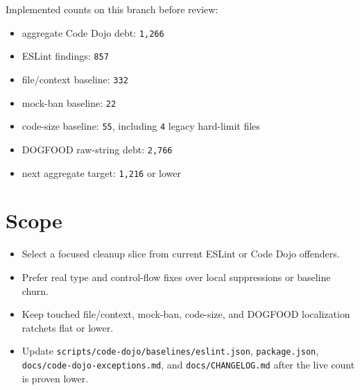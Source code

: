 Implemented counts on this branch before review:

\begin{itemize}
\tightlist
\item
  aggregate Code Dojo debt: \texttt{1\allowbreak{},\allowbreak{}2\allowbreak{}6\allowbreak{}6}
\item
  ESLint findings: \texttt{8\allowbreak{}5\allowbreak{}7}
\item
  file/context baseline: \texttt{3\allowbreak{}3\allowbreak{}2}
\item
  mock-ban baseline: \texttt{2\allowbreak{}2}
\item
  code-size baseline: \texttt{5\allowbreak{}5}, including \texttt{4} legacy hard-limit files
\item
  DOGFOOD raw-string debt: \texttt{2\allowbreak{},\allowbreak{}7\allowbreak{}6\allowbreak{}6}
\item
  next aggregate target: \texttt{1\allowbreak{},\allowbreak{}2\allowbreak{}1\allowbreak{}6} or lower
\end{itemize}

\section{Scope}\label{record-230-scope}

\begin{itemize}
\tightlist
\item
  Select a focused cleanup slice from current ESLint or Code Dojo offenders.
\item
  Prefer real type and control-flow fixes over local suppressions or baseline churn.
\item
  Keep touched file/context, mock-ban, code-size, and DOGFOOD localization ratchets flat or lower.
\item
  Update \texttt{s\allowbreak{}c\allowbreak{}r\allowbreak{}i\allowbreak{}p\allowbreak{}t\allowbreak{}s\allowbreak{}/\allowbreak{}c\allowbreak{}o\allowbreak{}d\allowbreak{}e\allowbreak{}-\allowbreak{}d\allowbreak{}o\allowbreak{}j\allowbreak{}o\allowbreak{}/\allowbreak{}b\allowbreak{}a\allowbreak{}s\allowbreak{}e\allowbreak{}l\allowbreak{}i\allowbreak{}n\allowbreak{}e\allowbreak{}s\allowbreak{}/\allowbreak{}e\allowbreak{}s\allowbreak{}l\allowbreak{}i\allowbreak{}n\allowbreak{}t\allowbreak{}.\allowbreak{}j\allowbreak{}s\allowbreak{}o\allowbreak{}n}, \texttt{p\allowbreak{}a\allowbreak{}c\allowbreak{}k\allowbreak{}a\allowbreak{}g\allowbreak{}e\allowbreak{}.\allowbreak{}j\allowbreak{}s\allowbreak{}o\allowbreak{}n}, \texttt{d\allowbreak{}o\allowbreak{}c\allowbreak{}s\allowbreak{}/\allowbreak{}c\allowbreak{}o\allowbreak{}d\allowbreak{}e\allowbreak{}-\allowbreak{}d\allowbreak{}o\allowbreak{}j\allowbreak{}o\allowbreak{}-\allowbreak{}e\allowbreak{}x\allowbreak{}c\allowbreak{}e\allowbreak{}p\allowbreak{}t\allowbreak{}i\allowbreak{}o\allowbreak{}n\allowbreak{}s\allowbreak{}.\allowbreak{}m\allowbreak{}d}, and \texttt{d\allowbreak{}o\allowbreak{}c\allowbreak{}s\allowbreak{}/\allowbreak{}C\allowbreak{}H\allowbreak{}A\allowbreak{}N\allowbreak{}G\allowbreak{}E\allowbreak{}L\allowbreak{}O\allowbreak{}G\allowbreak{}.\allowbreak{}m\allowbreak{}d} after the live count is proven lower.
\end{itemize}

